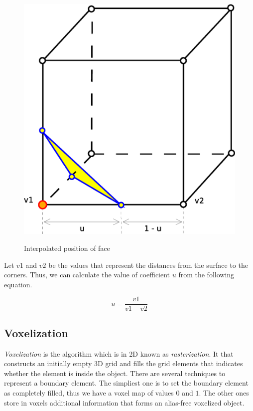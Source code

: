 \begin{figure}[!htbp]
\centering
\includegraphics[scale=0.35]{../img/marc_cub_inter.eps}
\label{fig:mc_interpolation}
\caption{Interpolated position of face}
\end{figure}

Let $v1$ and $v2$ be the values that represent the distances from the surface to the corners.
Thus, we can calculate the value of coefficient $u$ from the following equation.

\begin{equation}
u = \frac{v1}{v1-v2}
\end{equation}


\subsection{Voxelization}
\label{sub:vox}

\emph{Voxelization} is the algorithm which is in 2D known as \emph{rasterization}.
It that constructs an initially empty 3D grid and fills the
grid elements that indicates whether the element is inside the object\cite{Cohen-Or1995}. There are several techniques
to represent a boundary element. The simpliest one is to set the boundary element as completely filled, 
thus we have a voxel map of values $0$ and $1$. The other ones store in voxels additional
information that forms an alias-free voxelized object. \cite{Wang1993}\\

